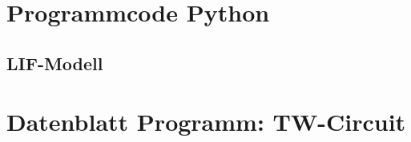 \appendix
%
\chapter{Programmcode Python}
%

	\section{LIF-Modell}
	\label{sec:lifpy}

%
\chapter{Datenblatt Programm: TW-Circuit}
%

